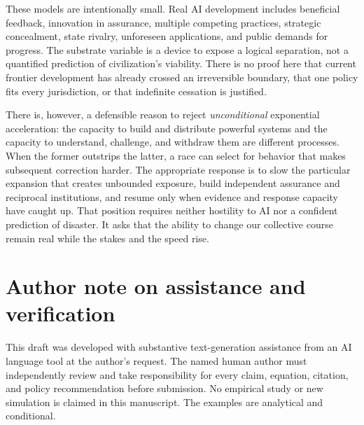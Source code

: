\documentclass[11pt]{article}
\begin{document}
These models are intentionally small. Real AI development includes beneficial feedback, innovation in assurance, multiple competing practices, strategic concealment, state rivalry, unforeseen applications, and public demands for progress. The substrate variable is a device to expose a logical separation, not a quantified prediction of civilization's viability. There is no proof here that current frontier development has already crossed an irreversible boundary, that one policy fits every jurisdiction, or that indefinite cessation is justified.

There is, however, a defensible reason to reject \emph{unconditional} exponential acceleration: the capacity to build and distribute powerful systems and the capacity to understand, challenge, and withdraw them are different processes. When the former outstrips the latter, a race can select for behavior that makes subsequent correction harder. The appropriate response is to slow the particular expansion that creates unbounded exposure, build independent assurance and reciprocal institutions, and resume only when evidence and response capacity have caught up. That position requires neither hostility to AI nor a confident prediction of disaster. It asks that the ability to change our collective course remain real while the stakes and the speed rise.

\section*{Author note on assistance and verification}
This draft was developed with substantive text-generation assistance from an AI language tool at the author's request. The named human author must independently review and take responsibility for every claim, equation, citation, and policy recommendation before submission. No empirical study or new simulation is claimed in this manuscript. The examples are analytical and conditional.
\end{document}
